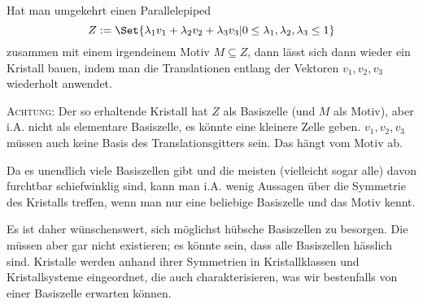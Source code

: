 \begin{remark}
Hat man umgekehrt einen Parallelepiped
\[Z:=\Set{\lambda_1v_1+\lambda_2v_2+\lambda_3v_3 | 0\leq\lambda_1,\lambda_2,\lambda_3\leq 1}\]
zusammen mit einem irgendeinem Motiv $M\subseteq Z$, dann lässt sich dann wieder ein Kristall bauen, indem man die Translationen entlang der Vektoren $v_1,v_2,v_3$ wiederholt anwendet.

\textsc{Achtung}: Der so erhaltende Kristall hat $Z$ als Basiszelle (und $M$ als Motiv), aber i.A. nicht als elementare Basiszelle, es könnte eine kleinere Zelle geben. $v_1,v_2,v_3$ müssen auch keine Basis des Translationsgitters sein. Das hängt vom Motiv ab.
\end{remark}

\begin{remark}
Da es unendlich viele Basiszellen gibt und die meisten (vielleicht sogar alle) davon furchtbar schiefwinklig sind, kann man i.A. wenig Aussagen über die Symmetrie des Kristalls treffen, wenn man nur eine beliebige Basiszelle und das Motiv kennt.

Es ist daher wünschenswert, sich möglichst hübsche Basiszellen zu besorgen. Die müssen aber gar nicht existieren; es könnte sein, dass alle Basiszellen hässlich sind. Kristalle werden anhand ihrer Symmetrien in Kristallklassen und Kristallsysteme eingeordnet, die auch charakterisieren, was wir bestenfalls von einer Basiszelle erwarten können.
\end{remark}